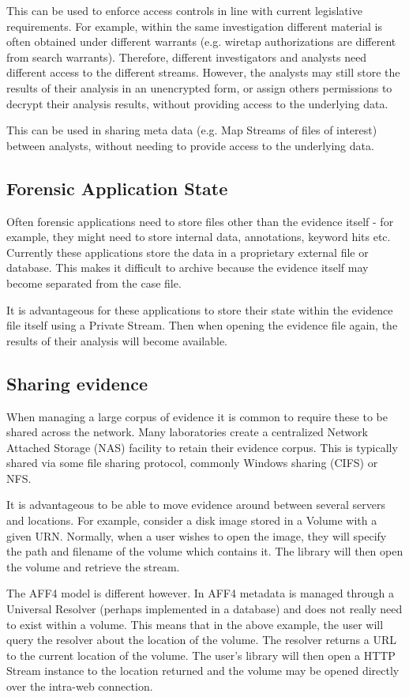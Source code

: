 \documentclass[10pt, conference]{IEEEtran}
\begin{document}
This can be used to enforce access controls in line with current
legislative requirements. For example, within the same investigation
different material is often obtained under different warrants
(e.g. wiretap authorizations are different from search
warrants). Therefore, different investigators and analysts need
different access to the different streams. However, the analysts may
still store the results of their analysis in an unencrypted form, or
assign others permissions to decrypt their analysis results, without
providing access to the underlying data. 

This can be used in sharing meta data (e.g. Map Streams of files of
interest) between analysts, without needing to provide access to the
underlying data.

\subsection{Forensic Application State}
Often forensic applications need to store files other than the
evidence itself - for example, they might need to store internal data,
annotations, keyword hits etc. Currently these applications store the
data in a proprietary external file or database. This makes it
difficult to archive because the evidence itself may become separated
from the case file.

It is advantageous for these applications to store their state within
the evidence file itself using a Private Stream. Then when opening the
evidence file again, the results of their analysis will become
available.

\subsection{Sharing evidence}
When managing a large corpus of evidence it is common to require these
to be shared across the network. Many laboratories create a
centralized Network Attached Storage (NAS) facility to retain their
evidence corpus. This is typically shared via some file sharing
protocol, commonly Windows sharing (CIFS) or NFS.

It is advantageous to be able to move evidence around between several
servers and locations. For example, consider a disk image stored in a
Volume with a given URN. Normally, when a user wishes to open the
image, they will specify the path and filename of the volume which
contains it. The library will then open the volume and retrieve the
stream.

The AFF4 model is different however. In AFF4 metadata is managed
through a Universal Resolver (perhaps implemented in a database) and
does not really need to exist within a volume. This means that in the
above example, the user will query the resolver about the location of
the volume. The resolver returns a URL to the current location of the
volume. The user's library will then open a HTTP Stream instance to
the location returned and the volume may be opened directly over the
intra-web connection.
\end{document}
